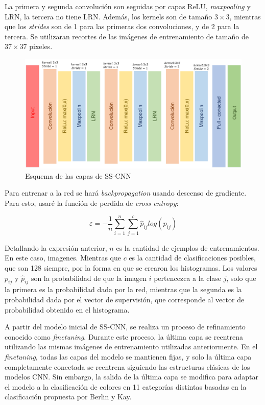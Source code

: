 \documentclass[14pt,a4paper]{report}
\begin{document}
La primera y segunda convolución son seguidas por capas ReLU, \textit{maxpooling} y LRN, la tercera no tiene LRN. Además, los kernels son de tamaño $3\times3$, mientras que los \textit{strides} son de 1 para las primeras dos convoluciones, y de 2 para la tercera. Se utilizaran recortes de las imágenes de entrenamiento de tamaño de $37\times 37$ pixeles.

\begin{figure}[h]
  \centering
\includegraphics[scale=0.5]{../esquema-capas.png} 
  \caption{Esquema de las capas de SS-CNN}
  \label{fig:neural-network}
\end{figure}

Para entrenar a la red se hará \textit{backpropagation} usando descenso de gradiente. Para esto, usaré la función de perdida de \textit{cross entropy}:

$$
\varepsilon = -\frac{1}{n}\sum^{n}_{i=1}\sum^{c}_{j=1}\hat{p}_{ij}log(p_{ij})
$$

Detallando la expresión anterior, $n$ es la cantidad de ejemplos de entrenamientos. En este caso, imagenes. Mientras que $c$ es la cantidad de clasificaciones posibles, que son 128 siempre, por la forma en que se crearon los histogramas. Los valores $p_{ij}$ y $\hat{p}_{ij}$ son la probabilidad de que la imagen $i$ pertencezca a la clase $j$, solo que la primera es la probabilidad dada por la red, mientras que la segunda es la probabilidad dada por el vector de supervisión, que corresponde al vector de probabilidad obtenido en el histograma.

A partir del modelo inicial de SS-CNN, se realiza un proceso de refinamiento conocido como \textit{finetuning}. Durante este proceso, la última capa se reentrena utilizando las mismas imágenes de entrenamiento utilizadas anteriormente. En el \textit{finetuning}, todas las capas del modelo se mantienen fijas, y solo la última capa completamente conectada se reentrena siguiendo las estructuras clásicas de los modelos CNN. Sin embargo, la salida de la última capa se modifica para adaptar el modelo a la clasificación de colores en 11 categorías distintas basadas en la clasificación propuesta por Berlin y Kay.
\end{document}
